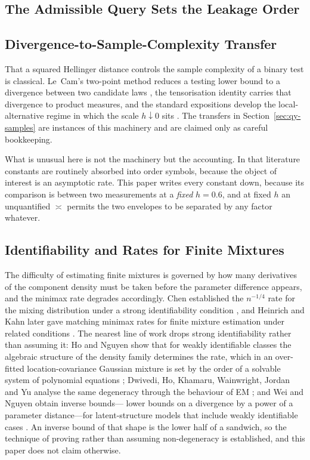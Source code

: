 \subsection{The Admissible Query Sets the Leakage Order}

\subsection{Divergence-to-Sample-Complexity Transfer}

That a squared Hellinger distance controls the sample complexity of a binary test is
classical. Le~Cam's two-point method reduces a testing lower bound to a divergence between
two candidate laws \cite{lecam1973}, the tensorisation identity carries that divergence to
product measures, and the standard expositions develop the local-alternative regime in which
the scale $h\downarrow0$ sits \cite{tsybakov2009,ibragimov1981}. The transfers in
Section~\ref{sec:qy-samples} are instances of this machinery and are claimed only as careful
bookkeeping.

What is unusual here is not the machinery but the accounting. In that literature constants
are routinely absorbed into order symbols, because the object of interest is an asymptotic
rate. This paper writes every constant down, because its comparison is between two
measurements at a \emph{fixed} $h=0.6$, and at fixed $h$ an unquantified $\asymp$ permits
the two envelopes to be separated by any factor whatever.

\subsection{Identifiability and Rates for Finite Mixtures}

The difficulty of estimating finite mixtures is governed by how many derivatives of the
component density must be taken before the parameter difference appears, and the minimax
rate degrades accordingly. Chen established the $n^{-1/4}$ rate for the mixing distribution
under a strong identifiability condition \cite{chen1995}, and Heinrich and Kahn later gave
matching minimax rates for finite mixture estimation under related conditions
\cite{heinrich2018}. The nearest line of work drops strong identifiability rather than
assuming it: Ho and Nguyen show that for weakly identifiable classes the algebraic structure
of the density family determines the rate, which in an over-fitted location-covariance
Gaussian mixture is set by the order of a solvable system of polynomial equations
\cite{ho2015}; Dwivedi, Ho, Khamaru, Wainwright, Jordan and Yu analyse the same degeneracy
through the behaviour of EM \cite{dwivedi2019}; and Wei and Nguyen obtain inverse bounds---%
lower bounds on a divergence by a power of a parameter distance---for latent-structure
models that include weakly identifiable cases \cite{wei2020}. An inverse bound of that shape
is the lower half of a sandwich, so the technique of proving rather than assuming
non-degeneracy is established, and this paper does not claim otherwise.

